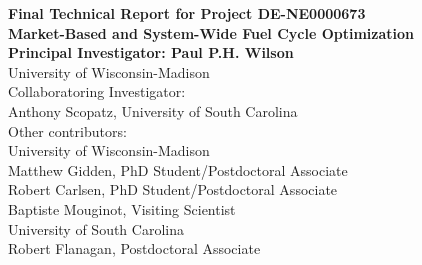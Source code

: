 
\begin{titlepage}
  \begin{center}
    {\Large\bfseries Final Technical Report for Project DE-NE0000673}\\[1cm]
    {\huge\bfseries Market-Based and System-Wide Fuel Cycle Optimization}\\

    \vspace{2cm}
    {\bfseries Principal Investigator: Paul P.H. Wilson}\\[5pt]
    University of Wisconsin-Madison\\

    \vspace{2cm}
    Collaboratoring Investigator:\\[5pt]
    Anthony Scopatz, University of South Carolina\\

    \vspace{2cm}
    Other contributors:\\[5pt]
    University of Wisconsin-Madison\\
    Matthew Gidden, PhD Student/Postdoctoral Associate\\
    Robert Carlsen, PhD Student/Postdoctoral Associate\\
    Baptiste Mouginot, Visiting Scientist\\[20pt]
    University of South Carolina\\
    Robert Flanagan, Postdoctoral Associate
    \vfill



    
  \end{center}
\end{titlepage}
